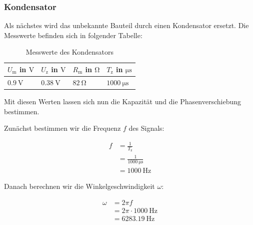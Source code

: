         \subsubsection{Kondensator}
        \label{sec:Versuch2_Kondensator}
            
            Als nächstes wird das unbekannte Bauteil durch einen Kondensator ersetzt. Die Messwerte befinden sich in folgender Tabelle:

            \begin{table}[H]
                \centering
                \caption{Messwerte des Kondensators}
                \vspace{1em}
                \begin{tabular}{|l|l|l|l|}
                    \hline
                    $U_{\mathrm{m}}$ in $\mathrm{V}$ & $U_{\mathrm{z}}$ in $\mathrm{V}$ & $R_{\mathrm{m}}$ in $\mathrm{\Omega}$ & $T_{\mathrm{z}}$ in $\mathrm{\mu s}$\\
                    \hline
                    \hline
                    $0.9\ \mathrm{V}$ & $0.38\ \mathrm{V}$ & $82\ \mathrm{\Omega}$ & $1000\ \mathrm{\mu s}$\\
                    \hline
                \end{tabular}
                \label{tab:Versuch2_Kondensator}
            \end{table}

            Mit diesen Werten lassen sich nun die Kapazität und die Phasenverschiebung bestimmen.
            
            Zunächst bestimmen wir die Frequenz $f$ des Signals:

            \begin{equation}
                \begin{aligned}
                    f &= \frac{1}{T_{\mathrm{z}}}\\
                      &= \frac{1}{1000\ \mathrm{\mu s}}\\
                      &= 1000\ \mathrm{Hz}
                \end{aligned}
                \label{eq:Versuch2_Kondensator_Frequenz}
            \end{equation}

            Danach berechnen wir die Winkelgeschwindigkeit $\omega$:

            \begin{equation}
                \begin{aligned}
                    \omega &= 2 \pi f\\
                           &= 2 \pi \cdot 1000\ \mathrm{Hz}\\
                           &= 6283.19\ \mathrm{Hz}
                \end{aligned}
                \label{eq:Versuch2_Kondensator_Winkelgeschwindigkeit}
            \end{equation}

